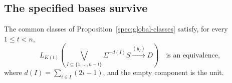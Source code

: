 \subsection{The specified bases survive}

\begin{theorem}
\label{thm:height-bases}
The common classes of Proposition~\ref{spec:global-classes} satisfy,
for every \(1\leq t<n\),
\begin{equation}
L_{K(t)}\left(
\bigvee_{I\subseteq\{1,\ldots,n-t\}}
 \Sigma^{-d(I)}S\xrightarrow{(y_I)}D
\right)
\quad\text{is an equivalence},
\label{spec:height-basis}
\end{equation}
where \(d(I)=\sum_{i\in I}(2i-1)\), and the empty component is the
unit.
\end{theorem}

